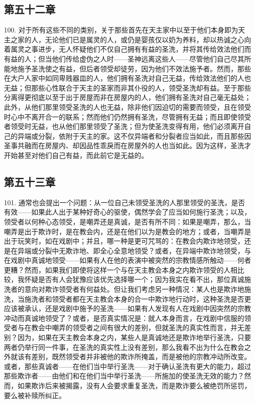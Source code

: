 
\subsection{第五十二章}

100. 对于所有这些不同的类别，关于那些首先在天主家中以至于他们本身即为天主之家的人，无论他们已是属灵的人，或仍是婴孩仅以奶为养料，却以热诚之心向着属灵之事进步，无人怀疑他们不仅自己拥有有益的圣洗，并将其传给效法他们而有益的人；但当他们传给虚伪之人时——圣神远离这些人——尽管他们自己尽其所能地施予圣洗使之有益，但后者领受却徒劳，因为他们不效法施予者。然而，那些在大户人家中如同卑贱器皿的人，他们拥有圣洗对自己无益，传给效法他们的人也无益；但那些心性联合于天主的圣家而非其仆役的人，领受圣洗却有益。至于那些分离得更彻底以至于出于房屋而非在房屋内的人，他们拥有圣洗对自己毫无益处；此外，从他们那里领受圣洗的人也无益，除非他们因迫切的需要而领受，且在领受时心中不离开合一的联系；然而他们仍然拥有圣洗，尽管拥有无益；而且即使领受者领受时无益，也从他们那里领受了圣洗；但为使圣洗变得有用，他们必须离开自己的异端或分裂，依附于天主的家。这不仅异端者和分裂者应当如此，而且那些因圣事共融而在房屋内、却因品性乖戾而在房屋外的人也当如此。因为这样，圣洗才开始甚至对他们自己有益，而此前它是无益的。\par


\subsection{第五十三章}

101. 通常也会提出一个问题：从一位自己未领受圣洗的人那里领受的圣洗，是否有效——如果此人出于某种好奇心的驱使，偶然学会了应当如何施行圣洗；以及，领受者以何种心态领受，是嘲弄还是真诚，是否有所不同：如果是嘲弄，那么，当嘲弄是出于欺诈时，是在教会内，还是在他们以为是教会的地方；或者，当嘲弄是出于玩笑时，如在戏剧中；并且，哪一种是更可咒骂的：在教会内欺诈地领受，还是在异端或分裂中无欺诈地、即全心全意地领受？或者，在异端中欺诈地领受，与在戏剧中真诚地领受——如果有人在他的表演中被突然的宗教情感所触动——何者更糟？然而，如果我们即使将这样一个与在天主教会本身之内欺诈领受的人相比较，我怀疑是否有人会犹豫应该优先选择哪一个；因为我实在看不出，那位真诚施洗者的意向对欺诈领受者有何益处。但让我们考虑另一种情况：某人也是欺诈地施洗，当施洗者和领受者都在天主教会本身的合一中欺诈地行动时，这种圣洗是否更应该被承认，还是戏剧中施予的圣洗——如果有人发现有人在戏剧中因突然的宗教冲动而真诚地领受了？或者，是否真实情况是：就人本身而言，在戏剧中信服的领受者与在教会中嘲弄的领受者之间有很大的差别，但就圣洗的真实性而言，并无差别？因为，如果在天主教会本身之内，某些人是真诚地还是欺诈地举行圣洗，只要两者仍举行同一件事，在圣洗的真实性上没有差别，那么我看不出为什么在教会之外就该有差别，既然领受者并非被他的欺诈所掩盖，而是被他的宗教冲动所改变。或者，那些真诚者——在他们当中举行圣洗——对于确认圣洗有更大的能力，超过那些欺诈者——由他们和在他们当中举行圣洗——所施加的使圣洗无效的能力？然而，如果欺诈后来被揭露，没有人会要求重复圣洗，而是欺诈要么被绝罚所惩罚，要么被补赎所纠正。\par


